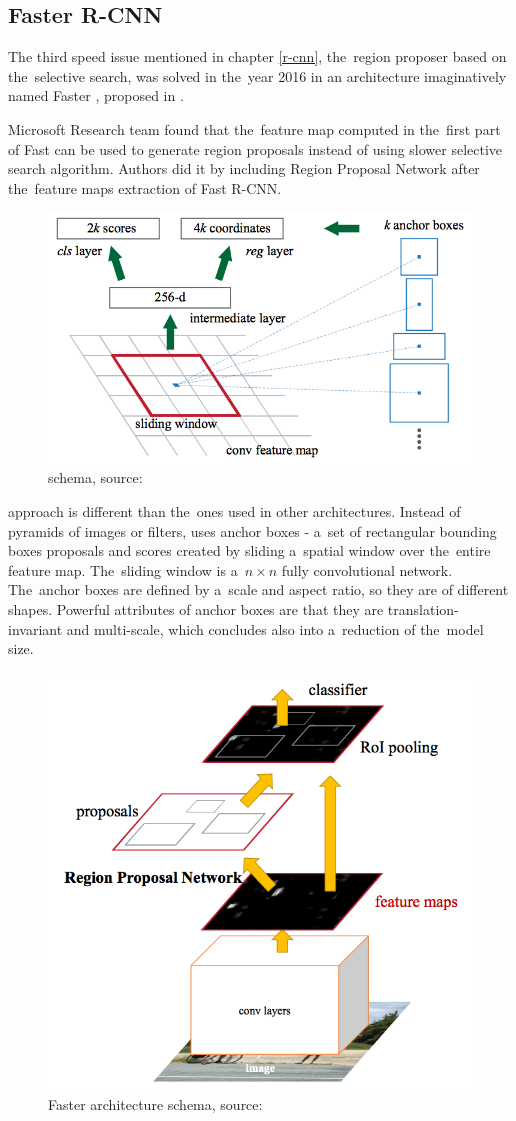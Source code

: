\subsection{Faster R-CNN}
\label{faster-rcnn}

The third speed issue mentioned in chapter \ref{r-cnn}, the~region proposer 
based on the~selective search, was solved in the~year 2016 in an architecture 
imaginatively named Faster , proposed in \cite{faster-rcnn}.

Microsoft Research team found that the~feature map computed in the~first part of 
Fast  can be used to generate region proposals instead of using slower 
selective search algorithm. Authors did it by including Region Proposal 
Network  after the~feature maps extraction of Fast R-CNN.

\begin{figure}[H]
   \centering
	\includegraphics[width=.5\linewidth]{./pictures/fasterrcnn-anchors.png}
	\caption[Region proposal network]{ schema, source: \cite{faster-rcnn}}
      \label{fig:rpn}
\end{figure}

 approach is different than the~ones used in other architectures. 
Instead of pyramids of images or filters,  uses anchor boxes - a~set of 
rectangular bounding boxes proposals and scores created by sliding a~spatial 
window over the~entire feature map. The~sliding window is a~$n \times n$ fully 
convolutional network. The~anchor boxes are defined by a~scale and aspect ratio, 
so they are of different shapes. Powerful attributes of anchor boxes are that 
they are translation-invariant and multi-scale, which concludes also into
a~reduction of the~model size.

\begin{figure}[H]
   \centering
	\includegraphics[width=.55\linewidth]{./pictures/fasterrcnn.png}
	\caption[Faster R-CNN architecture]{Faster  architecture schema, 
source: \cite{faster-rcnn}}
      \label{fig:faster-rcnn}
\end{figure}

